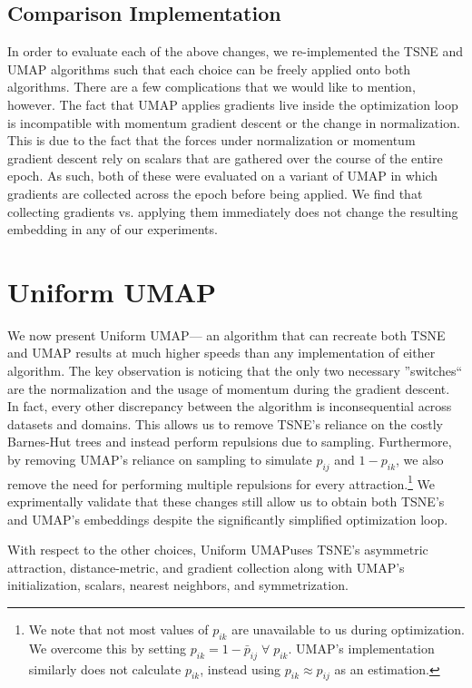 \documentclass[sigconf, nonacm]{acmart}
\newcommand\ourmethod{Uniform UMAP}
\begin{document}
\subsection{Comparison Implementation}
In order to evaluate each of the above changes, we re-implemented the TSNE and UMAP algorithms such that each choice can be freely applied onto both algorithms.
There are a few complications that we would like to mention, however. The fact that UMAP applies gradients live inside the optimization loop is incompatible
with momentum gradient descent or the change in normalization. This is due to the fact that the forces under normalization or momentum gradient
descent rely on scalars that are gathered over the course of the entire epoch. As such, both of these were evaluated on a variant of UMAP in which gradients are
collected across the epoch before being applied. We find that collecting gradients vs. applying them immediately does not change the resulting
embedding in any of our experiments.

\section{\ourmethod} \label{uniform}
We now present \ourmethod  --- an algorithm that can recreate both TSNE and UMAP results at much higher speeds than any implementation of either algorithm.
The key observation is noticing that the only two necessary ''switches`` are the normalization and the usage of momentum during the gradient descent. In fact,
every other discrepancy between the algorithm is inconsequential across datasets and domains. This allows us to remove TSNE's reliance on the costly Barnes-Hut
trees and instead perform repulsions due to sampling.
Furthermore, by removing UMAP's reliance on sampling to simulate $p_{ij}$ and $1 - p_{ik}$, we also remove the need for performing multiple repulsions for every
attraction.\footnote{We note that not most values of $p_{ik}$ are unavailable to us during optimization. We overcome this by setting $p_{ik} = 1 - \bar{p}_{ij}
\; \forall \; p_{ik}$. UMAP's implementation similarly does not calculate $p_{ik}$, instead using $p_{ik} \approx p_{ij}$ as an estimation.} We exprimentally
validate that these changes still allow us to obtain both TSNE's and UMAP's embeddings despite the significantly simplified optimization loop.

With respect to the other choices, \ourmethod  uses TSNE's asymmetric attraction, distance-metric, and gradient collection along with UMAP's
initialization, scalars, nearest neighbors, and symmetrization.
\end{document}
